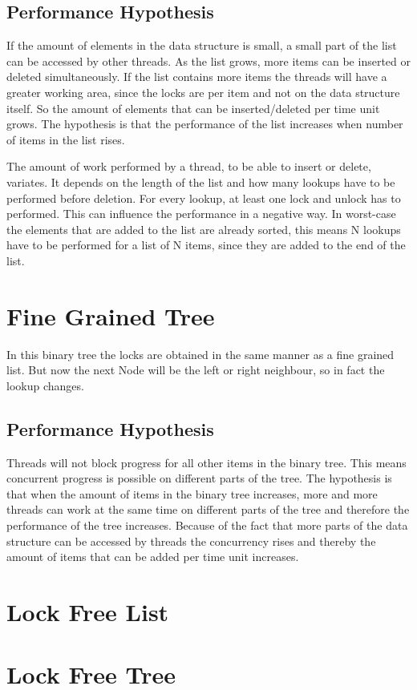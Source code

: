 \documentclass[10pt,a4paper]{article}
\begin{document}
\subsection{Performance Hypothesis}
If the amount of elements in the data structure is small, a small part of the
list can be accessed by other threads. As the list grows, more items can be 
inserted or deleted simultaneously. If the list contains more items the threads
will have a greater working area, since the locks are per item and not on the
data structure itself. So the amount of elements that can be inserted/deleted 
per time unit grows.
The hypothesis is that the performance of the list increases when number of
items in the list rises.

The amount of work performed by a thread, to be able to insert or delete, variates.
It depends on the length of the list and how many lookups have to be performed
before deletion. For every lookup, at least one lock and unlock has to performed. This can
influence the performance in a negative way. In worst-case the elements that
are added to the list are already sorted, this means N lookups have to be
performed for a list of N items, since they are added to the end of the list.

\section{Fine Grained Tree}
In this binary tree the locks are obtained in the same manner as a fine grained
list. But now the next Node will be the left or right neighbour, so in fact the
lookup changes. 

\subsection{Performance Hypothesis}
Threads will not block progress for all other items in the binary tree. This
means concurrent progress is possible on different parts of the tree.
The hypothesis is that when the amount of items
in the binary tree increases, more and more threads can work at the same time
on different parts of the tree and therefore the performance of the tree increases.
Because of the fact that more parts of the data structure can be accessed by
threads the concurrency rises and thereby the amount of items that can be added
per time unit increases.


\section{Lock Free List}

\section{Lock Free Tree}
\end{document}
